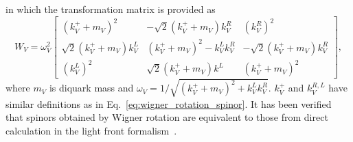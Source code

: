 \documentclass[aps,prc,preprint,groupedaddress,showpacs,superscriptaddress,floatfix]{revtex4-1}
\begin{document}
%
in which the transformation matrix is provided as~\cite{ahluwalia_front_1993}
%
\begin{equation}
  W_V = \omega_V^2
  \begin{bmatrix}
    (k_V^++m_V)^2 & -\sqrt{2} (k_V^++m_V)k_V^R & (k_V^R)^2\\
    \sqrt{2} (k_V^++m_V)k_V^L & (k_V^++m_V)^2-k_V^L k_V^R & 
    -\sqrt{2} (k_V^++m_V)k_V^R\\
    (k_V^L)^2 & \sqrt{2}(k_V^++m_V)k^L & (k_V^++m_V)^2
  \end{bmatrix},
\label{eq:W_V}
\end{equation}
%
where $m_V$ is diquark mass and $\omega_V = 1/ \sqrt{(k_V^++m_V)^2+k_V^L k_V^R}$. $k_V^+$ and $k_V^{R,L}$ have similar definitions as in Eq.~\eqref{eq:wigner_rotation_spinor}.
It has been verified that spinors obtained by Wigner rotation are equivalent to those from direct calculation in the light front formalism~\cite{lepage_exclusive_1980}.
\end{document}
